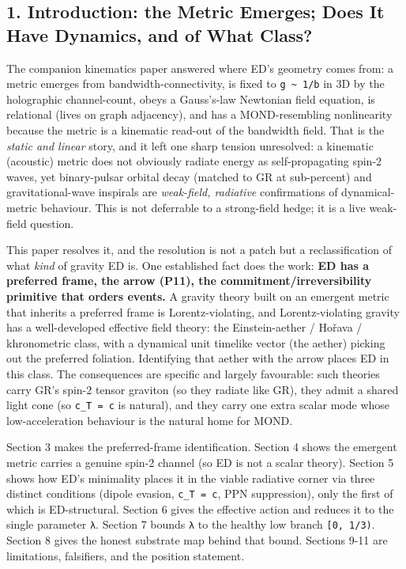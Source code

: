 \documentclass[
]{article}
\begin{document}
\subsection{1. Introduction: the Metric Emerges; Does It Have Dynamics,
and of What
Class?}\label{introduction-the-metric-emerges-does-it-have-dynamics-and-of-what-class}

The companion kinematics paper answered where ED's geometry comes from:
a metric emerges from bandwidth-connectivity, is fixed to
\texttt{g\ \textasciitilde{}\ 1/b} in 3D by the holographic
channel-count, obeys a Gauss's-law Newtonian field equation, is
relational (lives on graph adjacency), and has a MOND-resembling
nonlinearity because the metric is a kinematic read-out of the bandwidth
field. That is the \emph{static and linear} story, and it left one sharp
tension unresolved: a kinematic (acoustic) metric does not obviously
radiate energy as self-propagating spin-2 waves, yet binary-pulsar
orbital decay (matched to GR at sub-percent) and gravitational-wave
inspirals are \emph{weak-field, radiative} confirmations of
dynamical-metric behaviour. This is not deferrable to a strong-field
hedge; it is a live weak-field question.

This paper resolves it, and the resolution is not a patch but a
reclassification of what \emph{kind} of gravity ED is. One established
fact does the work: \textbf{ED has a preferred frame, the arrow (P11),
the commitment/irreversibility primitive that orders events.} A gravity
theory built on an emergent metric that inherits a preferred frame is
Lorentz-violating, and Lorentz-violating gravity has a well-developed
effective field theory: the Einstein-aether / Hořava / khronometric
class, with a dynamical unit timelike vector (the aether) picking out
the preferred foliation. Identifying that aether with the arrow places
ED in this class. The consequences are specific and largely favourable:
such theories carry GR's spin-2 tensor graviton (so they radiate like
GR), they admit a shared light cone (so \texttt{c\_T\ =\ c} is natural),
and they carry one extra scalar mode whose low-acceleration behaviour is
the natural home for MOND.

Section 3 makes the preferred-frame identification. Section 4 shows the
emergent metric carries a genuine spin-2 channel (so ED is not a scalar
theory). Section 5 shows how ED's minimality places it in the viable
radiative corner via three distinct conditions (dipole evasion,
\texttt{c\_T\ =\ c}, PPN suppression), only the first of which is
ED-structural. Section 6 gives the effective action and reduces it to
the single parameter \texttt{λ}. Section 7 bounds \texttt{λ} to the
healthy low branch \texttt{{[}0,\ 1/3)}. Section 8 gives the honest
substrate map behind that bound. Sections 9-11 are limitations,
falsifiers, and the position statement.
\end{document}
